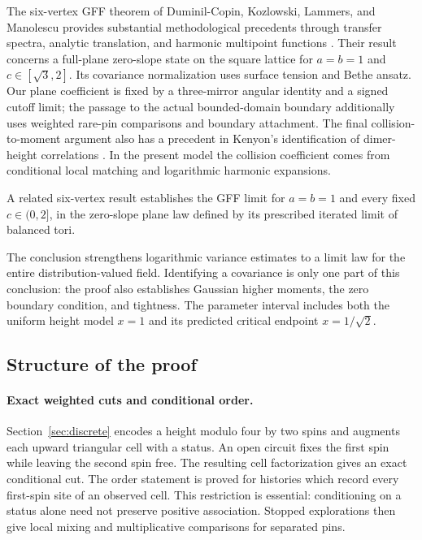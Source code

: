 \documentclass[11pt]{article}
\theoremstyle{definition}
\theoremstyle{remark}
\numberwithin{equation}{section}
\begin{document}
The six-vertex GFF theorem of Duminil-Copin, Kozlowski, Lammers, and
Manolescu provides substantial methodological precedents through transfer
spectra, analytic translation, and harmonic multipoint functions
\cite[Section~4.5; Lemma~7.4; Section~7.2]{DCKLM2026}.  Their result concerns a
full-plane zero-slope state on the square lattice for
$a=b=1$ and $c\in[\sqrt3,2]$.  Its covariance normalization uses
surface tension and Bethe ansatz.  Our plane coefficient is fixed by a
three-mirror angular identity and a signed cutoff limit; the passage to
the actual bounded-domain boundary additionally uses weighted rare-pin
comparisons and boundary attachment.  The final collision-to-moment
argument also has a precedent in Kenyon's identification of dimer-height
correlations \cite[Lemma~3.1 and Proposition~3.2]{Kenyon2001}.  In the present model the
collision coefficient comes from conditional local matching and
logarithmic harmonic expansions.

A related six-vertex result \cite[Theorem~1.1]{BalancedSixVertexGFF2026}
establishes the GFF limit for $a=b=1$ and every fixed $c\in(0,2]$, in the
zero-slope plane law defined by its prescribed iterated limit of balanced tori.

The conclusion strengthens logarithmic variance estimates to a limit
law for the entire distribution-valued field.  Identifying a covariance
is only one part of this conclusion: the proof also establishes Gaussian
higher moments, the zero boundary condition, and tightness.  The parameter
interval includes both the uniform height model $x=1$ and its predicted
critical endpoint $x=1/\sqrt2$.

\subsection{Structure of the proof}

\paragraph{Exact weighted cuts and conditional order.}
Section~\ref{sec:discrete} encodes a height modulo four by two spins and
augments each upward triangular cell with a status.  An open circuit fixes
the first spin while leaving the second spin free.  The resulting cell
factorization gives an exact conditional cut.  The order statement is
proved for histories which record every first-spin site of an observed
cell.  This restriction is essential: conditioning on a status alone need
not preserve positive association.  Stopped explorations then give local
mixing and multiplicative comparisons for separated pins.
\end{document}
